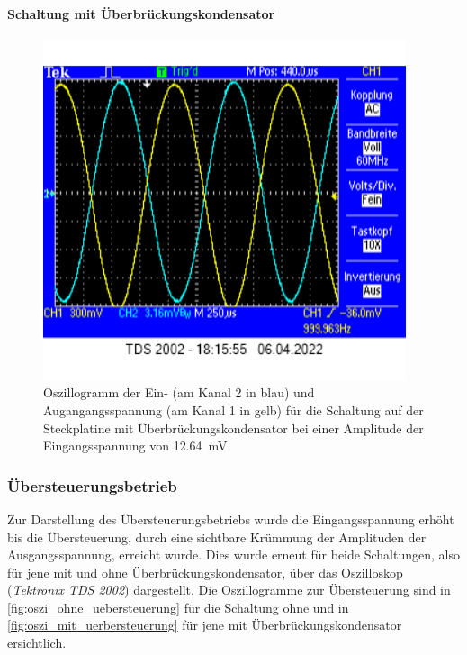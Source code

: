\documentclass[12pt,english,ngerman]{scrartcl}
\begin{document}
\paragraph{Schaltung mit Überbrückungskondensator}
\begin{figure}[H]
  \centering
    \includegraphics[width=\linewidth, height=10cm]{./figures/messungen/mitkond24mv.png}
  \caption{Oszillogramm der Ein- (am Kanal 2 in blau) und Augangangsspannung (am Kanal 1 in gelb) für die Schaltung auf der Steckplatine mit Überbrückungskondensator bei einer Amplitude der Eingangsspannung von \SI{12,64}{\milli\volt}}
  \label{fig:oszi_mit_normal}
\end{figure}



\subsubsection{Übersteuerungsbetrieb}
Zur Darstellung des Übersteuerungsbetriebs wurde die Eingangsspannung erhöht bis die 
Übersteuerung, durch eine sichtbare Krümmung der Amplituden der Ausgangsspannung, erreicht
wurde. Dies wurde erneut für beide Schaltungen, also für jene mit und ohne 
Überbrückungskondensator, über das Oszilloskop (\textit{Tektronix TDS 2002}) dargestellt.
Die Oszillogramme zur Übersteuerung sind in \autoref{fig:oszi_ohne_uebersteuerung} für die 
Schaltung ohne und in \autoref{fig:oszi_mit_uerbersteuerung} für jene mit 
Überbrückungskondensator ersichtlich.
\end{document}

